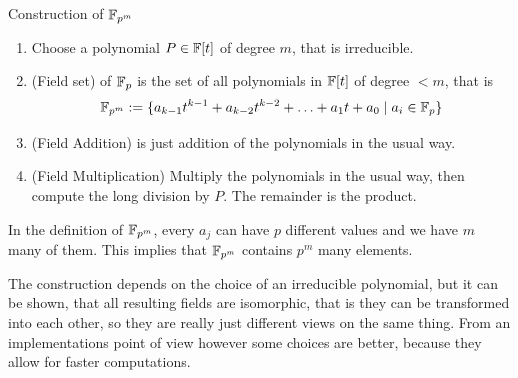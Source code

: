 Construction of $\mathbb{F}_{p^m}$ 
\begin{enumerate}
\item Choose a polynomial $P\in \mathbb{F}[t]$ of degree $m$, that is irreducible.
\item (Field set) of $\mathbb{F}_{p}$ is the set of all polynomials in $\mathbb{F}[t]$ of degree $<m$, that is 
$$\mathbb{F}_{p^m}:=\{a_{k-1} t^{k-1}+a_{k-2}t^{k-2}+\ldots+a_1 t+a_0\;|\; a_i\in \mathbb{F}_p\}$$
\item (Field Addition) is just addition of the polynomials in the usual way.
\item (Field Multiplication) Multiply the polynomials in the usual way, then compute the long division by $P$. The remainder is the product.
\end{enumerate}
\begin{remark}
In the definition of $\mathbb{F}_{p^m}$, every $a_j$ can have $p$ different values and we have $m$ many of them. This implies that $\mathbb{F}_{p^m}$ contains $p^m$ many elements.

The construction depends on the choice of an irreducible polynomial, but it can be shown, that all resulting fields are isomorphic, that is they can be transformed into each other, so they are really just different views on the same thing. From an implementations point of view however some choices are better, because they allow for faster computations.
\end{remark}
